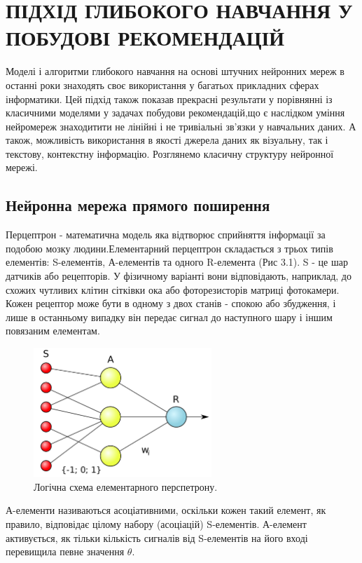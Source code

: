 \section{ПІДХІД ГЛИБОКОГО НАВЧАННЯ У ПОБУДОВІ РЕКОМЕНДАЦІЙ}
Моделі і алгоритми глибокого навчання на основі штучних нейронних мереж в останні роки знаходять своє використання у багатьох прикладних сферах інформатики. Цей підхід також показав прекрасні результати у порівнянні із класичними моделями у задачах побудови рекомендацій,що є наслідком уміння нейромереж знаходитити не лінійні і не тривіальні зв’язки у навчальних даних. А також, можливість використання в якості джерела даних як візуальну, так і текстову, контекстну інформацію. Розглянемо класичну структуру нейронної мережі.


\subsection{Нейронна мережа прямого поширення}
Перцептрон - математична модель яка відтворює сприйняття інформації за подобою мозку людини.Елементарний перцептрон складається з трьох типів елементів: S-елементів, А-елементів та одного R-елемента (Рис 3.1). S - це шар датчиків або рецепторів. У фізичному варіанті вони відповідають, наприклад, до схожих чутливих клітин сітківки ока або фоторезисторів матриці фотокамери. Кожен рецептор може бути в одному з двох станів - спокою або збудження, і лише в останньому випадку він передає сигнал до наступного шару і іншим  повязаним елементам.
\begin{figure}[H]
    \centering
    \includegraphics[width=0.6\textwidth]{images/LogicalPerceptron.png}
    \caption{Логічна схема елементарного перспетрону.}
\end{figure}
А-елементи називаються асоціативними, оскільки кожен такий елемент, як правило, відповідає цілому набору (асоціацій) S-елементів. А-елемент активується, як тільки кількість сигналів від S-елементів на його вході перевищила певне значення $\theta$.

